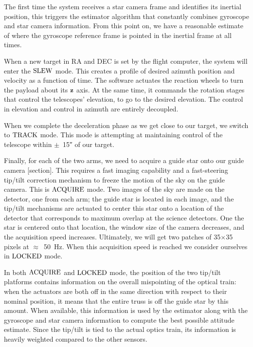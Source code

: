 The first time the system receives a star camera frame and identifies its inertial position, this triggers the estimator algorithm that constantly combines gyroscope and star camera information. From this point on, we have a reasonable estimate of where the gyroscope reference frame is pointed in the inertial frame at all times. 

When a new target in RA and DEC is set by the flight computer, the system will enter the $\textrm{SLEW}$ mode. This creates a profile of desired azimuth position and velocity as a function of time. The software actuates the reaction wheels to turn the payload about its $\textrm{\textbf{z}}$ axis. At the same time, it commands the rotation stages that control the telescopes' elevation, to go to the desired elevation. The control in elevation and control in azimuth are entirely decoupled.

When we complete the deceleration phase as we get close to our target, we switch to $\textrm{TRACK}$ mode. This mode is attempting at maintaining control of the telescope within $\pm$~\ang{;;15} of our target.

Finally, for each of the two arms, we need to acquire a guide star onto our guide camera [section]. This requires a fast imaging capability and a fast-steering tip/tilt correction mechanism to freeze the motion of the sky on the guide camera. This is $\textrm{ACQUIRE}$ mode. Two images of the sky are made on the detector, one from each arm; the guide star is located in each image, and the tip/tilt mechanisms are actuated to center this star onto a location of the detector that corresponds to maximum overlap at the science detectors. One the star is centered onto that location, the window size of the camera decreases, and the acquisition speed increases. Ultimately, we will get two patches of 35$\times$35 pixels at $\approx$~\SI{50}{\hertz}. When this acquisition speed is reached we consider ourselves in $\textrm{LOCKED}$ mode.

In both $\textrm{ACQUIRE}$ and $\textrm{LOCKED}$ mode, the position of the two tip/tilt platforms contains information on the overall mispointing of the optical train: when the actuators are both off in the same direction with respect to their nominal position, it means that the entire truss is off the guide star by this amount. When available, this information is used by the estimator along with the gyroscope and star camera information to compute the best possible attitude estimate. Since the tip/tilt is tied to the actual optics train, its information is heavily weighted compared to the other sensors. 

